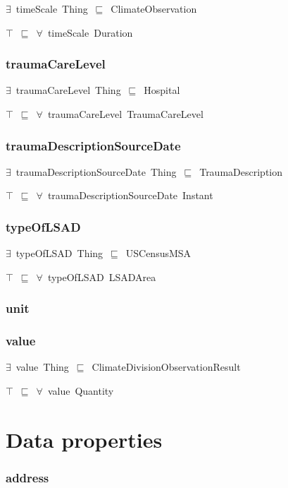 \documentclass{article}
\begin{document}
\ensuremath{\exists}~timeScale~Thing~\ensuremath{\sqsubseteq}~ClimateObservation

\ensuremath{\top}~\ensuremath{\sqsubseteq}~\ensuremath{\forall}~timeScale~Duration

\subsubsection*{traumaCareLevel}

\ensuremath{\exists}~traumaCareLevel~Thing~\ensuremath{\sqsubseteq}~Hospital

\ensuremath{\top}~\ensuremath{\sqsubseteq}~\ensuremath{\forall}~traumaCareLevel~TraumaCareLevel

\subsubsection*{traumaDescriptionSourceDate}

\ensuremath{\exists}~traumaDescriptionSourceDate~Thing~\ensuremath{\sqsubseteq}~TraumaDescription

\ensuremath{\top}~\ensuremath{\sqsubseteq}~\ensuremath{\forall}~traumaDescriptionSourceDate~Instant

\subsubsection*{typeOfLSAD}

\ensuremath{\exists}~typeOfLSAD~Thing~\ensuremath{\sqsubseteq}~USCensusMSA

\ensuremath{\top}~\ensuremath{\sqsubseteq}~\ensuremath{\forall}~typeOfLSAD~LSADArea

\subsubsection*{unit}

\subsubsection*{value}

\ensuremath{\exists}~value~Thing~\ensuremath{\sqsubseteq}~ClimateDivisionObservationResult

\ensuremath{\top}~\ensuremath{\sqsubseteq}~\ensuremath{\forall}~value~Quantity

\section*{Data properties}\subsubsection*{address}
\end{document}

